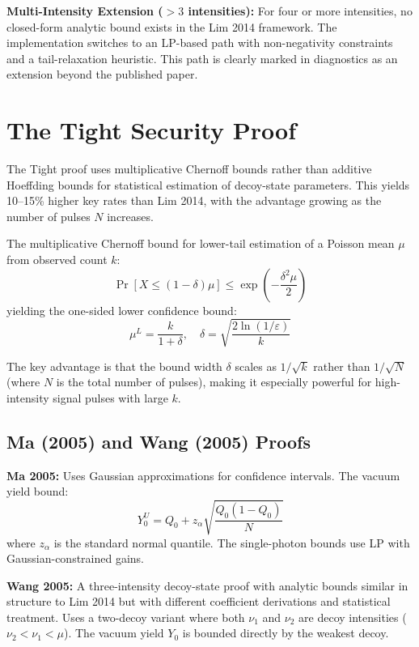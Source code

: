 \documentclass[11pt,a4paper,oneside]{report}
\begin{document}
\textbf{Multi-Intensity Extension ($>3$ intensities):} For four or more intensities, no closed-form analytic bound exists in the Lim 2014 framework. The implementation switches to an LP-based path with non-negativity constraints and a tail-relaxation heuristic. This path is clearly marked in diagnostics as an extension beyond the published paper.

\section{The Tight Security Proof}

The Tight proof uses multiplicative Chernoff bounds rather than additive Hoeffding bounds for statistical estimation of decoy-state parameters. This yields 10–15\% higher key rates than Lim 2014, with the advantage growing as the number of pulses $N$ increases.

The multiplicative Chernoff bound for lower-tail estimation of a Poisson mean $\mu$ from observed count $k$:
\begin{equation}
\Pr[X \leq (1-\delta)\mu] \leq \exp\left(-\frac{\delta^2\mu}{2}\right)
\end{equation}
yielding the one-sided lower confidence bound:
\begin{equation}
\mu^L = \frac{k}{1+\delta}, \quad \delta = \sqrt{\frac{2\ln(1/\varepsilon)}{k}}
\end{equation}

The key advantage is that the bound width $\delta$ scales as $1/\sqrt{k}$ rather than $1/\sqrt{N}$ (where $N$ is the total number of pulses), making it especially powerful for high-intensity signal pulses with large $k$.

\subsection{Ma (2005) and Wang (2005) Proofs}

\textbf{Ma 2005:} Uses Gaussian approximations for confidence intervals. The vacuum yield bound:
\begin{equation}
Y_0^U = Q_0 + z_{\alpha}\sqrt{\frac{Q_0(1-Q_0)}{N}}
\end{equation}
where $z_{\alpha}$ is the standard normal quantile. The single-photon bounds use LP with Gaussian-constrained gains.

\textbf{Wang 2005:} A three-intensity decoy-state proof with analytic bounds similar in structure to Lim 2014 but with different coefficient derivations and statistical treatment. Uses a two-decoy variant where both $\nu_1$ and $\nu_2$ are decoy intensities ($\nu_2 < \nu_1 < \mu$). The vacuum yield $Y_0$ is bounded directly by the weakest decoy.
\end{document}
